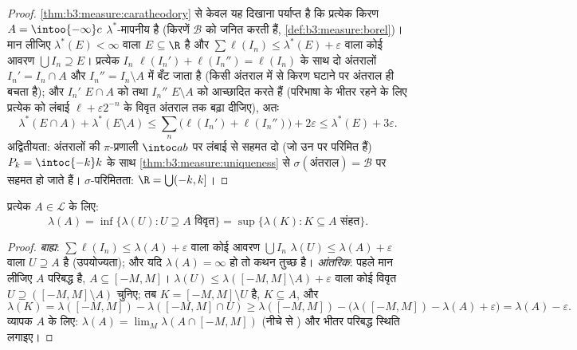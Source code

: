 \begin{proof}
\cref{thm:b3:measure:caratheodory} से केवल यह दिखाना पर्याप्त है कि प्रत्येक किरण $A = \intoo{-\infty}c$
$\lambda^*$-मापनीय है (किरणें $\mathcal B$ को जनित करती हैं, \cref{def:b3:measure:borel})। मान
लीजिए $\lambda^*(E) < \infty$ वाला $E \subseteq \R$ है और $\sum\ell(I_n) \leq \lambda^*(E) + \varepsilon$ वाला कोई आवरण $\bigcup I_n \supseteq E$। प्रत्येक
$I_n$ $\ell(I_n') + \ell(I_n'') = \ell(I_n)$ के साथ दो अंतरालों $I_n' = I_n \cap A$ और $I_n'' = I_n\setminus A$ में बँट जाता है
(किसी अंतराल में से किरण घटाने पर अंतराल ही बचता है); और $I_n'$
$E \cap A$ को तथा $I_n''$ $E \setminus A$ को आच्छादित करते हैं (परिभाषा के भीतर
रहने के लिए प्रत्येक को लंबाई $\ell +
\varepsilon2^{-n}$ के विवृत अंतराल तक बढ़ा
दीजिए), अतः
\[
\lambda^*(E\cap A) + \lambda^*(E\setminus A)
\leq \sum_n\bigl(\ell(I_n') + \ell(I_n'')\bigr) + 2\varepsilon
\leq \lambda^*(E) + 3\varepsilon .
\]
अद्वितीयता: अंतरालों की $\pi$-प्रणाली $\intoc ab$ पर लंबाई से सहमत दो
 (जो उन पर परिमित हैं) $P_k = \intoc{-k}k$ के साथ \cref{thm:b3:measure:uniqueness} से $\sigma(\text{अंतराल}) = \mathcal B$ पर सहमत हो
जाते हैं। $\sigma$-परिमितता: $\R = \bigcup(-k, k]$।
\end{proof}

\begin{theorem}[नियमितता]\label{thm:b3:measure:regularity}
प्रत्येक $A \in \mathcal L$ के लिए:
\[
\lambda(A) = \inf\{\lambda(U) : U \supseteq A \text{ विवृत}\}
= \sup\{\lambda(K) : K \subseteq A \text{ संहत}\}.
\]
\end{theorem}

\begin{proof}
\emph{बाह्य}: $\sum\ell(I_n) \leq
\lambda(A) + \varepsilon$ वाला कोई आवरण $\bigcup I_n$ $\lambda(U) \leq \lambda(A) + \varepsilon$ वाला 
$U \supseteq A$ है (उपयोज्यता); और यदि $\lambda(A) = \infty$ हो तो कथन तुच्छ है।
\emph{आंतरिक}: पहले मान लीजिए $A$ परिबद्ध है, $A \subseteq [-M, M]$। $\lambda(U) \leq
\lambda([-M,M]\setminus A) + \varepsilon$ वाला
कोई विवृत $U \supseteq ([-M,M]\setminus A)$ चुनिए; तब $K = [-M,
M]\setminus U$  है, $K \subseteq A$, और
\[
\lambda(K) = \lambda([-M,M]) - \lambda([-M,M]\cap U)
\geq \lambda([-M,M]) - \bigl(\lambda([-M,M]) - \lambda(A) +
\varepsilon\bigr) = \lambda(A) - \varepsilon .
\]
व्यापक $A$ के लिए: $\lambda(A) = \lim_M\lambda(A\cap[-M,M])$ (नीचे से ) और भीतर परिबद्ध
स्थिति लगाइए।
\end{proof}

